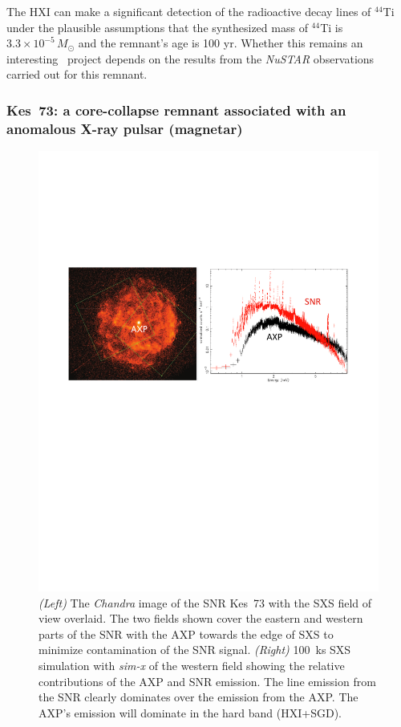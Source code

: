 \documentclass[11pt,a4paper]{article}
\begin{document}
{The HXI can make a significant detection of the radioactive decay lines
of $^{44}$Ti under the plausible assumptions that the synthesized mass
of $^{44}$Ti is $3.3\times 10^{-5}\, M_\odot$ and the remnant's age is
100 yr.  Whether this remains an interesting \ah\ project depends on
the results from the {\it NuSTAR} observations carried out for this remnant.


\vspace{-0.3cm}
\subsubsection{Kes~73: a core-collapse remnant associated with an anomalous
 X-ray pulsar (magnetar)} \label{subsec:kes73}

\begin{figure}
\begin{center}
\includegraphics[width=1.0\textwidth]{kes73_fig1b.pdf}
\caption{{\it (Left)} The \textit{Chandra} image of the SNR Kes~73 with the
  SXS field of view overlaid. The two fields shown cover the eastern
  and western parts of the SNR with the AXP towards the edge of SXS to
  minimize contamination of the SNR signal.  {\it (Right)} 100~ks SXS
  simulation with \textit{sim-x} of the western field showing the relative
  contributions of the AXP and SNR emission. The line emission from
  the SNR clearly dominates over the emission from the AXP. The AXP's emission
  will dominate in the hard band (HXI+SGD).}
\label{fig:kes73fov}
\end{center}
\end{figure}

}
\end{document}
